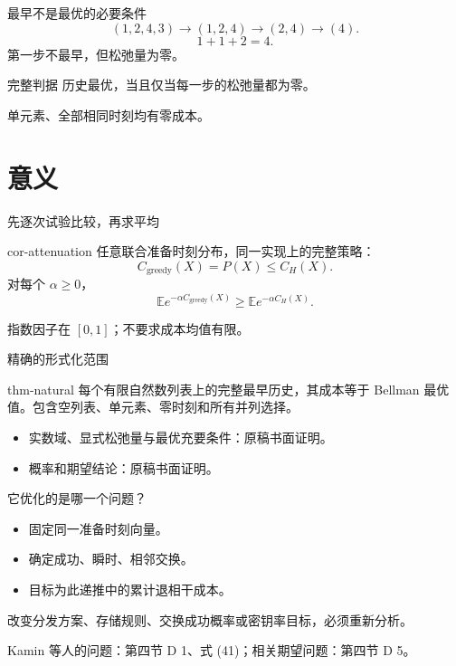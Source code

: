 \documentclass{beamer}
\begin{document}
\begin{frame}{最早不是最优的必要条件}
\[
(1,2,4,3)\to(1,2,4)\to(2,4)\to(4).
\]
\[
1+1+2=4.
\]
第一步不最早，但松弛量为零。

\begin{block}{完整判据}
历史最优，当且仅当每一步的松弛量都为零。
\end{block}
单元素、全部相同时刻均有零成本。
\end{frame}
\section{意义}
\begin{frame}{先逐次试验比较，再求平均}
\begin{bookresult}{cor-attenuation}
任意联合准备时刻分布，同一实现上的完整策略：
\[
C_{\mathrm{greedy}}(X)=P(X)\leq C_H(X).
\]
对每个 $\alpha\geq0$，
\[
\mathbb E e^{-\alpha C_{\mathrm{greedy}}(X)}
\geq \mathbb E e^{-\alpha C_H(X)}.
\]
\end{bookresult}
指数因子在 $[0,1]$；不要求成本均值有限。
\end{frame}
\begin{frame}{精确的形式化范围}
\begin{bookresult}{thm-natural}
每个有限自然数列表上的完整最早历史，其成本等于 Bellman 最优值。包含空列表、单元素、零时刻和所有并列选择。
\end{bookresult}
\begin{itemize}
\item 实数域、显式松弛量与最优充要条件：原稿书面证明。
\item 概率和期望结论：原稿书面证明。
\end{itemize}
\end{frame}
\begin{frame}{它优化的是哪一个问题？}
\begin{itemize}
\item 固定同一准备时刻向量。
\item 确定成功、瞬时、相邻交换。
\item 目标为此递推中的累计退相干成本。
\end{itemize}

改变分发方案、存储规则、交换成功概率或密钥率目标，必须重新分析。

\medskip
Kamin 等人的问题：第四节 D 1、式 (41)；相关期望问题：第四节 D 5。
\end{frame}
\end{document}
